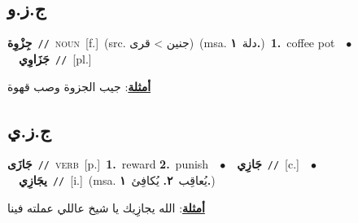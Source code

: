 \documentclass[10pt,a4paper,twoside]{article} %
\begin{document}
\begin{multicols}{2}
\vspace{-3mm}
\subsection*{\color{blue}\foreignlanguage{arabic}{ج.ز.و}\color{blue}{}} 

{\setlength\topsep{0pt}\textbf{\foreignlanguage{arabic}{جِزْوِة}}\ {\color{gray}\texttt{//}\color{black}}\ \textsc{noun}\ [f.]\ (src. \color{gray}\foreignlanguage{arabic}{جنين > قرى}\color{black})\ \color{gray}(msa. \foreignlanguage{arabic}{دلة}~\foreignlanguage{arabic}{\textbf{١.}})\color{black}\ \textbf{1.}~coffee pot\ \ $\bullet$\ \ \setlength\topsep{0pt}\textbf{\foreignlanguage{arabic}{جَزَاوِي}}\ {\color{gray}\texttt{//}\color{black}}\ [pl.]\  \begin{flushright}\color{gray}\foreignlanguage{arabic}{\textbf{\underline{\foreignlanguage{arabic}{أمثلة}}}: جيب الجزوة وصب قهوة}\end{flushright}\color{black}} \vspace{2mm}

\vspace{-3mm}
\subsection*{\color{blue}\foreignlanguage{arabic}{ج.ز.ي}\color{blue}{}} 

{\setlength\topsep{0pt}\textbf{\foreignlanguage{arabic}{جَازَى}}\ {\color{gray}\texttt{//}\color{black}}\ \textsc{verb}\ [p.]\ \textbf{1.}~reward  \textbf{2.}~punish\ \ $\bullet$\ \ \setlength\topsep{0pt}\textbf{\foreignlanguage{arabic}{جَازِي}}\ {\color{gray}\texttt{//}\color{black}}\ [c.]\ \ $\bullet$\ \ \setlength\topsep{0pt}\textbf{\foreignlanguage{arabic}{يجَازِي}}\ {\color{gray}\texttt{//}\color{black}}\ [i.]\ \color{gray}(msa. \foreignlanguage{arabic}{يُعاقِب}~\foreignlanguage{arabic}{\textbf{٢.}}  \foreignlanguage{arabic}{يُكافِئ}~\foreignlanguage{arabic}{\textbf{١.}})\color{black}\  \begin{flushright}\color{gray}\foreignlanguage{arabic}{\textbf{\underline{\foreignlanguage{arabic}{أمثلة}}}: الله يجازِيك يا شيخ عاللي عملته فينا}\end{flushright}\color{black}} \vspace{2mm}


\end{multicols}
\end{document}
